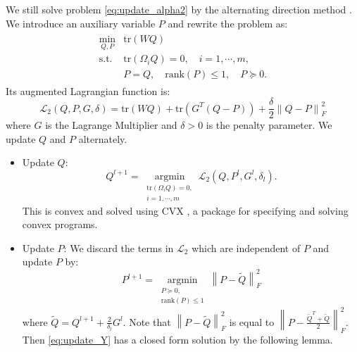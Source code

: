 \documentclass[10pt,twocolumn,letterpaper]{article}
\DeclareMathOperator*{\argmin}{argmin}
\begin{document}
We still solve problem \eqref{eq:update_alpha2} by the alternating
direction method \cite{liu2013linearized}. We introduce an
auxiliary variable $P$ and rewrite the problem as:
\begin{eqnarray}
\begin{array}{rl}
\underset{Q, P}{\text{min}}
& {\mbox{tr}(W Q)} \\
\text{s.t.} & \mbox{tr}(\Omega_i Q) = 0, \quad i=1,\cdots,m, \\
& P = Q, \quad \mbox{rank}(P) \leq 1, \quad P \succeq 0.
\end{array}
\label{eq:update_alpha_aux}
\end{eqnarray}
Its augmented Lagrangian function is:
\begin{equation*}
\mathcal{L}_{2}(Q,P,G,\delta)=\mbox{tr}(W Q) + \mbox{tr}(G^T(Q-P))
+ \frac{\delta}{2}{\left\| Q-P \right\|_F^2 }
\label{eq:update_alpha_aux2}
\end{equation*}
where $G$ is the Lagrange Multiplier and $\delta>0$ is the penalty
parameter. We update $Q$ and $P$ alternately.

\begin{itemize}
\item {Update $Q$: }
\begin{equation}
Q^{l+1}=\argmin\limits_{
\begin{array}{c}
\mbox{tr}(\Omega_i Q)=0,\\
i=1,\cdots,m
\end{array}
} \mathcal{L}_{2}(Q,P^l,G^l,\delta_l). \label{eq:update_T}
\end{equation}
This is convex and solved using CVX \cite{c23}, a package for specifying and solving convex programs.

\item{Update $P$: } We discard the terms in $\mathcal{L}_{2}$
which are independent of $P$ and update $P$ by:
\begin{equation}
P^{l+1}=\argmin\limits_{
\begin{array}{c}
P \succeq 0,\\
\mbox{rank}(P) \leq 1
\end{array}
} \left\|P-\tilde{Q}\right\|_F^2 \label{eq:update_Y}
\end{equation}
where $\tilde{Q}=Q^{l+1}+\frac{2}{\delta_l}{G^l}$. Note that $
\left\|P-\tilde{Q} \right\|_F^2$ is equal to $\left\| P-
\frac{\tilde{Q}^T+\tilde{Q}}{2} \right\|_F^2$. Then
\eqref{eq:update_Y} has a closed form solution by the following
lemma.
\end{itemize}
\end{document}
